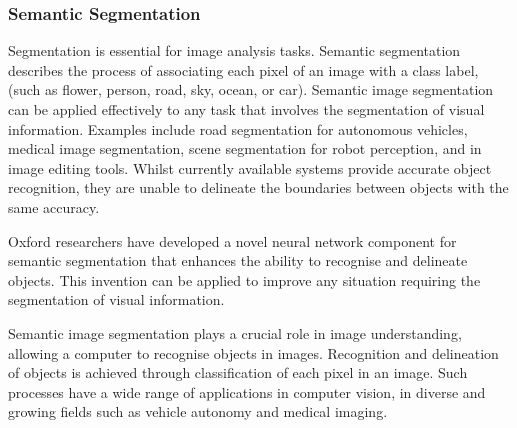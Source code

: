 \documentclass{article}
\begin{document}




\subsubsection{
Semantic Segmentation
}
Segmentation is essential for image analysis tasks. Semantic segmentation describes the process of associating each pixel of an image with a class label, (such as flower, person, road, sky, ocean, or car).
Semantic image segmentation can be applied effectively to any task that involves the segmentation of visual information. Examples include road segmentation for autonomous vehicles, medical image segmentation, scene segmentation for robot perception, and in image editing tools. Whilst currently available systems provide accurate object recognition, they are unable to delineate the boundaries between objects with the same accuracy.

Oxford researchers have developed a novel neural network component for semantic segmentation that enhances the ability to recognise and delineate objects. This invention can be applied to improve any situation requiring the segmentation of visual information.

Semantic image segmentation plays a crucial role in image understanding, allowing a computer to recognise objects in images. Recognition and delineation of objects is achieved through classification of each pixel in an image. Such processes have a wide range of applications in computer vision, in diverse and growing fields such as vehicle autonomy and medical imaging.
\end{document}

